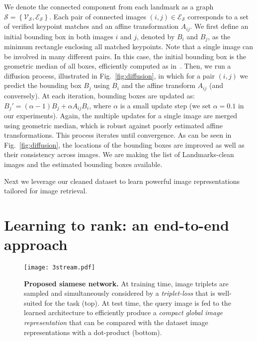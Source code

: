 \documentclass[twocolumn]{svjour3}          \smartqed  \usepackage{graphicx}
\begin{document}
{We denote the connected component from each landmark as a graph $\mathcal{S}=\left\{
\mathcal{V}_{\mathcal{S}},\mathcal{E}_{\mathcal{S}}\right\} $.  Each pair of connected images
$(i,j)\in\mathcal{E}_{\mathcal{S}}$ corresponds to a set of verified keypoint matches and an affine
transformation $A_{ij}$.  We first define an initial bounding box in both images $i$ and $j$, denoted by $B_{i}$ and
$B_{j}$, as the minimum rectangle enclosing all matched keypoints. Note that a single image can be involved in many
different pairs. In this case, the initial bounding box is the geometric median of all boxes, efficiently computed
as in~\cite{GeoMedian2004}. Then, we run a diffusion process, illustrated in Fig.~\ref{fig:diffusion}, in which for a
pair $(i,j)$ we predict the bounding box $B_{j}$ using $B_{i}$ and the affine transform $A_{ij}$ (and conversely).  At
each iteration, bounding boxes are updated as: $B_{j}'=(\alpha-1)B_{j}+\alpha A_{ij}B_{i}$, where $\alpha$ is a small
update step (we set $\alpha=0.1$ in our experiments). Again, the multiple updates for a single image are merged using
geometric median, which is robust against poorly estimated affine transformations.  This process iterates until
convergence. As can be seen in Fig.~\ref{fig:diffusion}, the locations of the bounding boxes are improved as well as 
their consistency across images.}
We are making the list of Landmarks-clean images and the estimated bounding boxes available. 

Next we leverage our cleaned dataset to learn powerful image representations tailored for image retrieval.

\section{Learning to rank: an end-to-end approach}
\label{sec:part1}

\begin{figure*}[t!]
\texttt{[image: 3stream.pdf]}
\caption{\textbf{Proposed siamese network.} At training time, image triplets are
sampled and simultaneously considered by a \textit{triplet-loss} that is well-suited for the task (top).
At test time, the query image is fed to the learned architecture to
efficiently produce a \textit{compact global image representation} that can be compared with the dataset image representations with a
dot-product (bottom). \label{fig:siamese}}
\end{figure*}

\label{sec:method}
\end{document}
